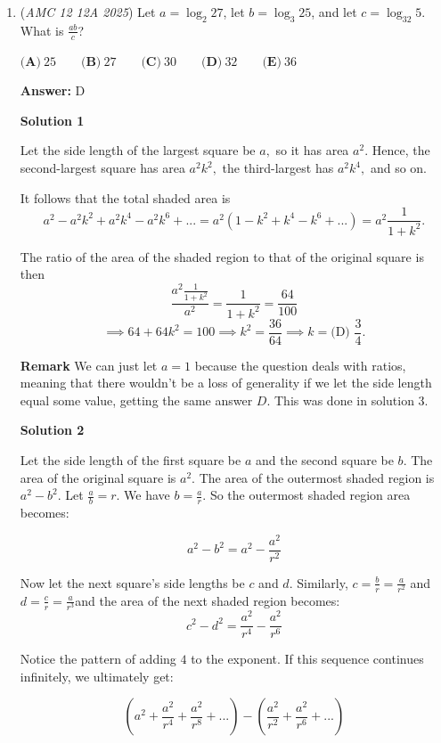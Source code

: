 \begin{enumerate}
 


	\item (\textit{AMC 12 12A 2025}) Let $a = \log_{2}27$, let $b = \log_{3}25$, and let $c = \log_{32}5$. What is $\frac{ab}{c}$?


 $\textbf{(A)}\   25  \qquad                 \textbf{(B)}\   27  \qquad                 \textbf{(C)}\   30  \qquad                 \textbf{(D)}\   32  \qquad                 \textbf{(E)}\   36$

 \textbf{Answer: }D



\textbf{Solution 1}

Let the side length of the largest square be $a,$ so it has area $a^2.$ Hence, the second-largest square has area $a^2k^2,$ the third-largest has $a^2k^4,$ and so on. 

 It follows that the total shaded area is 
 \[a^2-a^2k^2+a^2k^4-a^2k^6+...=a^2(1-k^2+k^4-k^6+...)=a^2\dfrac{1}{1+k^2}.\]

 The ratio of the area of the shaded region to that of the original square is then 
 \[\dfrac{a^2\frac{1}{1+k^2}}{a^2}=\dfrac{1}{1+k^2}=\dfrac{64}{100}\]
 \[\implies 64+64k^2=100\implies k^2=\dfrac{36}{64}\implies k=\boxed{\text{(D) }\dfrac{3}{4}}.\]

 \textbf{Remark} We can just let $a=1$ because the question deals with ratios, meaning that there wouldn't be a loss of generality if we let the side length equal some value, getting the same answer $\boxed{D}$. This was done in solution 3.

 



\textbf{Solution 2}

Let the side length of the first square be $a$ and the second square be $b$. The area of the original square is $a^2.$ The area of the outermost shaded region is $a^2 - b^2.$ Let $\frac{a}{b} = r.$ We have $b = \frac{a}{r}.$ So the outermost shaded region area becomes: 

 
 \[a^2 - b^2 = a^2 - \frac{a^2}{r^2}\]

 Now let the next square's side lengths be $c$ and $d.$ Similarly, $c = \frac{b}{r} = \frac{a}{r^2}$ and $d = \frac{c}{r} = \frac{a}{r^3}$and the area of the next shaded region becomes: 
 \[c^2 - d^2 = \frac{a^2}{r^4} - \frac{a^2}{r^6}\] 

 Notice the pattern of adding $4$ to the exponent. If this sequence continues infinitely, we ultimately get: 

 
 \[(a^2 + \frac{a^2}{r^4} + \frac{a^2}{r^8} + ...) - (\frac{a^2}{r^2} + \frac{a^2}{r^6} + ...)\] 


\end{enumerate}
